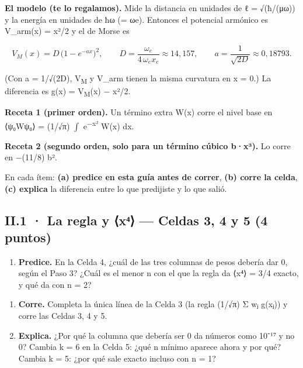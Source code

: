 \textbf{El modelo (te lo regalamos).} Mide la distancia en unidades de ℓ = √(ħ/(μω)) y la energía en unidades de ħω (= ωe). Entonces el potencial armónico es V\_arm(x) = x²/2 y el de Morse es

\[V_M(x)=D\,\big(1-e^{-a x}\big)^2,\qquad D=\frac{\omega_e}{4\,\omega_e x_e}\approx 14{,}157,\qquad a=\frac{1}{\sqrt{2D}}\approx 0{,}18793 .\]

(Con a = 1/√(2D), V\textsubscript{M} y V\_arm tienen la misma curvatura en x = 0.) La diferencia es g(x) = V\textsubscript{M}(x) − x²/2.

\textbf{Receta 1 (primer orden).} Un término extra W(x) corre el nivel base en ⟨ψ₀\textbar W\textbar ψ₀⟩ = (1/√π) \ensuremath{\int} e\textsuperscript{−x²} W(x) dx.

\textbf{Receta 2 (segundo orden, solo para un término cúbico b·x³).} Lo corre en −(11/8) b².

En cada ítem: \textbf{(a) predice en esta guía antes de correr}, \textbf{(b) corre la celda}, \textbf{(c) explica} la diferencia entre lo que predijiste y lo que salió.

\subsection{II.1 · La regla y ⟨x⁴⟩ --- Celdas 3, 4 y 5 (4 puntos)}

\begin{enumerate}
\def\labelenumi{\alph{enumi})}
\tightlist
\item
  \textbf{Predice.} En la Celda 4, ¿cuál de las tres columnas de pesos debería dar 0, según el Paso 3? ¿Cuál es el menor n con el que la regla da ⟨x⁴⟩ = 3/4 exacto, y qué da con n = 2?
\end{enumerate}


\begin{enumerate}
\def\labelenumi{\alph{enumi})}
\setcounter{enumi}{1}
\item
  \textbf{Corre.} Completa la única línea de la Celda 3 (la regla (1/√π) Σ wⱼ g(xⱼ)) y corre las Celdas 3, 4 y 5.
\item
  \textbf{Explica.} ¿Por qué la columna que debería ser 0 da números como 10⁻¹⁷ y no 0? Cambia k = 6 en la Celda 5: ¿qué n mínimo aparece ahora y por qué? Cambia k = 5: ¿por qué sale exacto incluso con n = 1?
\end{enumerate}



